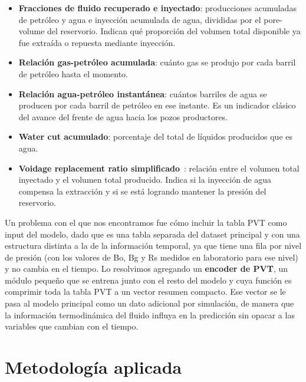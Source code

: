 \documentclass[12pt,a4paper]{article}
\begin{document}
\begin{itemize}
    \item \textbf{Fracciones de fluido recuperado e inyectado}: producciones acumuladas
    de petróleo y agua e inyección acumulada de agua, divididas por el pore-volume del reservorio.
    Indican qué proporción del volumen total disponible ya fue extraída o repuesta mediante inyección.

    \item \textbf{Relación gas-petróleo acumulada}: cuánto gas se produjo por
    cada barril de petróleo hasta el momento.

    \item \textbf{Relación agua-petróleo instantánea}: cuántos barriles de agua
    se producen por cada barril de petróleo en ese instante. Es un indicador clásico del avance del
    frente de agua hacia los pozos productores.

    \item \textbf{Water cut acumulado}: porcentaje del total de líquidos
    producidos que es agua.

    \item \textbf{Voidage replacement ratio simplificado}~\cite{vrr}: relación entre el
    volumen total inyectado y el volumen total producido. Indica si la inyección de agua compensa la
    extracción y si se está logrando mantener la presión del reservorio.
  \end{itemize}

Un problema con el que nos encontramos fue cómo incluir la tabla PVT como input del modelo, dado
que es una tabla separada del dataset principal y con una estructura distinta a la de la información
temporal, ya que tiene una fila por nivel de presión (con los valores de Bo, Bg y Rs medidos en
laboratorio para ese nivel) y no cambia en el tiempo.
Lo resolvimos agregando un \textbf{encoder de PVT}, un módulo pequeño que se entrena junto con el resto del modelo y cuya
función es comprimir toda la tabla PVT a un vector resumen compacto. Ese vector se le pasa al
modelo principal como un dato adicional por simulación, de manera que la información termodinámica
del fluido influya en la predicción sin opacar a las variables que cambian con el tiempo.

\newpage
\section{Metodología aplicada}
\end{document}
